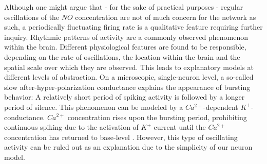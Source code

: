 \documentclass[10pt,a4paper]{article}
\begin{document}
Although one might argue that - for the sake of practical purposes - regular oscillations of the $NO$ concentration are not of much concern for the network as such, a periodically fluctuating firing rate is a qualitative feature requiring further inquiry. Rhythmic patterns of activity are a commonly observed phenomenon within the brain. Different physiological features are found to be responsible, depending on the rate of oscillations, the location within the brain and the spatial scale over which they are observed. This leads to explanatory models at different levels of abstraction. On a microscopic, single-neuron level, a so-called slow after-hyper-polarization conductance explains the appearance of bursting behavior: A relatively short period of spiking activity is followed by a longer period of silence. This phenomenon can be modeled by a $Ca^{2+}$-dependent $K^{+}$-conductance. $Ca^{2+}$ concentration rises upon the bursting period, prohibiting continuous spiking due to the activation of $K^{+}$  current until the $Ca^{2+}$ concentration has returned to base-level \cite[p.~203-207]{Theor_Neur_Dayan}. However, this type of oscillating activity can be ruled out as an explanation due to the simplicity of our neuron model.
\end{document}

